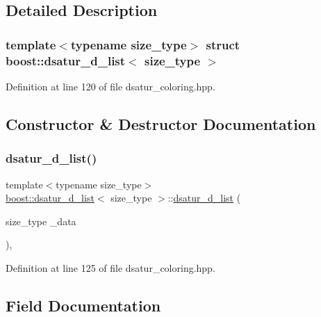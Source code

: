 \subsection{Detailed Description}
\subsubsection*{template$<$typename size\+\_\+type$>$\newline
struct boost\+::dsatur\+\_\+d\+\_\+list$<$ size\+\_\+type $>$}



Definition at line 120 of file dsatur\+\_\+coloring.\+hpp.



\subsection{Constructor \& Destructor Documentation}
\mbox{\label{structboost_1_1dsatur__d__list_a04a20e33fc873adefc9193ef99d71d39}} 
\subsubsection{\texorpdfstring{dsatur\+\_\+d\+\_\+list()}{dsatur\_d\_list()}}
{\footnotesize\ttfamily template$<$typename size\+\_\+type$>$ \\
\hyperlink{structboost_1_1dsatur__d__list}{boost\+::dsatur\+\_\+d\+\_\+list}$<$ size\+\_\+type $>$\+::\hyperlink{structboost_1_1dsatur__d__list}{dsatur\+\_\+d\+\_\+list} (\begin{DoxyParamCaption}\item[{size\+\_\+type}]{\+\_\+data }\end{DoxyParamCaption})\hspace{0.3cm}{\ttfamily [inline]}, {\ttfamily [explicit]}}



Definition at line 125 of file dsatur\+\_\+coloring.\+hpp.



\subsection{Field Documentation}
\mbox{\label{structboost_1_1dsatur__d__list_afd5ecbab8d365a7b731f627268f68e5c}} 

